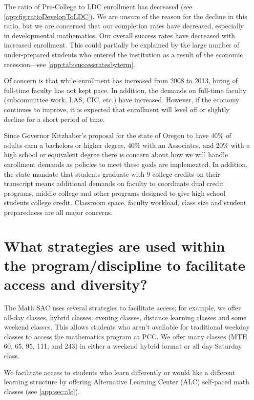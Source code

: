 The ratio of Pre-College to LDC enrollment has decreased (see
\vref{app:fig:ratioDevelopToLDC}). We are unsure of the reason for the decline
in this ratio, but we are concerned that our completion rates have decreased,
especially in developmental mathematics. Our overall success rates have
decreased with increased enrollment.  This could partially be explained by the
large number of under-prepared students who entered the institution as a result
of the economic recession---see \vref{app:tab:successratesbyterm}.

Of concern is that while enrollment has increased from 2008 to 2013, hiring of
full-time faculty has not kept pace. In addition, the demands on full-time
faculty (subcommittee work, LAS, CIC,  etc.) have increased.   However,
if the economy continues to improve, it is expected that enrollment will level
off or slightly decline for a short period of time.

Since Governor Kitzhaber's proposal for the state of Oregon to have 40\% of
adults earn a bachelors or higher degree, 40\% with an Associates, and 20\%
with a high school or equivalent degree there is concern about how we will handle
enrollment demands as policies to meet these goals are implemented. In
addition, the state mandate that students graduate with 9 college credits on
their transcript means additional demands on faculty to coordinate dual credit
programs, middle college and other programs designed to give high school
students college credit. Classroom space, faculty workload, class size and
student preparedness are all
major concerns.


\section[Strategies to facilitate access and diversity]{What strategies are
 used within the program/discipline to facilitate access and
 diversity?}\label{needs:sec:access}
The Math SAC uses several strategies to facilitate access; for
example, we offer all-day classes, hybrid classes, evening classes, distance learning classes
and some weekend classes. This allows students who aren't available for traditional
weekday classes to access the mathematics program at PCC. We offer many classes
(MTH 60, 65, 95, 111, and 243) in either a weekend hybrid format or all day
Saturday class.


We facilitate access to students who learn differently or would like a
different learning structure by offering  Alternative Learning Center (ALC)
self-paced math classes (see \vref{app:sec:alc}).

